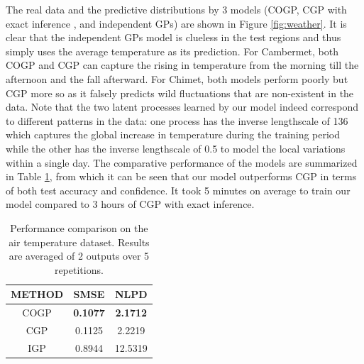 The real data and the predictive distributions by 3 models (COGP, CGP with exact inference \citet{alvarez-lawrence-nips-08}, and independent GPs) are shown in Figure \ref{fig:weather}.
It is clear that the independent GPs model is clueless in the test regions and thus simply uses the average temperature as its prediction.
For Cambermet, both COGP and CGP can capture the rising in temperature from the morning till the afternoon and the fall afterward.
For Chimet, both models perform poorly but CGP more so as it falsely predicts  wild fluctuations that are non-existent in the data. 
Note that the two latent processes learned by our model indeed correspond to different patterns in the data: one process has the inverse lengthscale of 136 which captures the global increase in temperature during the training period while the other has the inverse lengthscale of 0.5 to model the local variations within a single day.
The comparative performance of the models are summarized in Table \ref{tab:air}, from which it can be seen that our model outperforms CGP in terms of both test accuracy and confidence.
It took 5 minutes on average to train our model compared to 3 hours of CGP with exact inference.

\setlength{\tabcolsep}{4pt}
\begin{table}[t]
\caption{Performance comparison on the air temperature dataset. Results are averaged of 2 outputs over 5 repetitions. }
\label{tab:air}
\begin{center}
\begin{tabular}{ccc}
\toprule
\textbf{METHOD} & \textbf{SMSE} & \textbf{NLPD} \\
\hline
COGP & \textbf{0.1077} & \textbf{2.1712} \\
CGP & 0.1125 & 2.2219 \\
IGP & 0.8944 & 12.5319 \\
\bottomrule
\end{tabular}
\end{center}
\end{table}

